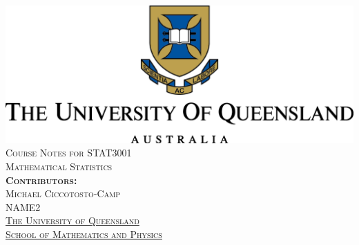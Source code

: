 \documentclass[11pt]{amsart}
\theoremstyle{remark}
\begin{document}
\thispagestyle{empty}
\begin{center}
  \includegraphics{university.png} \\
  \vspace{3cm}
  {\LARGE\textsc{Course Notes for STAT3001 \\ Mathematical Statistics}} \\
  \vspace{0.3cm}
  {\bf\textsc{Contributors:}} \\
  {\textsc{Michael Ciccotosto-Camp}} \\
  {\textsc{NAME2}} \\
  \vspace{1cm}
  \vspace{5cm}
  \vspace{1cm}
  {\textsc{\href{https://www.uq.edu.au/}{The University of Queensland}}} \\
  {\textsc{\href{https://smp.uq.edu.au/}{School of Mathematics and Physics}}}
\end{center}
\newpage



\thispagestyle{empty}
\
\newpage

\tableofcontents
\setlength{\parindent}{0pt} %
\setlength{\parskip}{2mm}
\newpage

\
\newpage


\newpage


\clearpage

\end{document}
